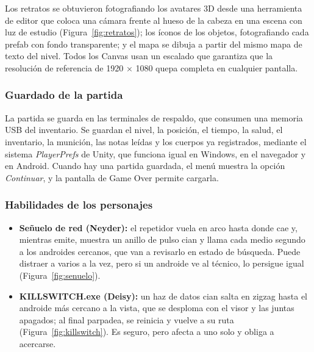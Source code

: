 Los retratos se obtuvieron fotografiando los avatares 3D desde una herramienta de editor que coloca
una cámara frente al hueso de la cabeza en una escena con luz de estudio (Figura~\ref{fig:retratos});
los íconos de los objetos, fotografiando cada prefab con fondo transparente; y el mapa se dibuja a
partir del mismo mapa de texto del nivel. Todos los Canvas usan un escalado que garantiza que la
resolución de referencia de 1920 × 1080 quepa completa en cualquier pantalla.


\subsubsection{Guardado de la partida}

La partida se guarda en las terminales de respaldo, que consumen una memoria USB del inventario.
Se guardan el nivel, la posición, el tiempo, la salud, el inventario, la munición, las notas leídas
y los cuerpos ya registrados, mediante el sistema \textit{PlayerPrefs} de Unity, que funciona igual
en Windows, en el navegador y en Android. Cuando hay una partida guardada, el menú muestra la opción
\textit{Continuar}, y la pantalla de Game Over permite cargarla.

\subsubsection{Habilidades de los personajes}

\begin{itemize}
  \item \textbf{Señuelo de red (Neyder):} el repetidor vuela en arco hasta donde cae y, mientras
        emite, muestra un anillo de pulso cian y llama cada medio segundo a los androides cercanos,
        que van a revisarlo en estado de búsqueda. Puede distraer a varios a la vez, pero si un
        androide ve al técnico, lo persigue igual (Figura~\ref{fig:senuelo}).
  \item \textbf{KILLSWITCH.exe (Deisy):} un haz de datos cian salta en zigzag hasta el androide más
        cercano a la vista, que se desploma con el visor y las juntas apagados; al final parpadea,
        se reinicia y vuelve a su ruta (Figura~\ref{fig:killswitch}). Es seguro, pero afecta a uno
        solo y obliga a acercarse.
\end{itemize}

